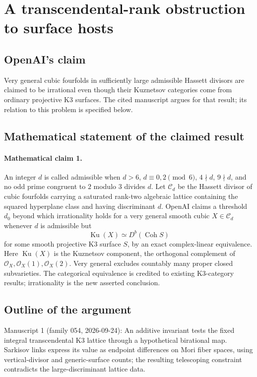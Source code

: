 \documentclass[11pt]{article}
\begin{document}
\section*{A transcendental-rank obstruction to surface hosts}

\subsection{OpenAI's claim}
Very general cubic fourfolds in sufficiently large admissible Hassett divisors are claimed to be irrational even though their Kuznetsov categories come from ordinary projective K3 surfaces. The cited manuscript argues for that result; its relation to this problem is specified below.

\subsection{Mathematical statement of the claimed result}
\paragraph{Mathematical claim 1.} An integer $d$ is called admissible when $d>6$, $d\equiv0,2\pmod6$, $4\nmid d$, $9\nmid d$, and no odd prime congruent to $2$ modulo $3$ divides $d$. Let $\mathcal C_d$ be the Hassett divisor of cubic fourfolds carrying a saturated rank-two algebraic lattice containing the squared hyperplane class and having discriminant $d$. OpenAI claims a threshold $d_0$ beyond which irrationality holds for a very general smooth cubic $X\in\mathcal C_d$ whenever $d$ is admissible but
\[
\operatorname{Ku}(X)\simeq D^b(\operatorname{Coh}S)
\]
for some smooth projective K3 surface $S$, by an exact complex-linear equivalence. Here $\operatorname{Ku}(X)$ is the Kuznetsov component, the orthogonal complement of $\mathcal O_X,\mathcal O_X(1),\mathcal O_X(2)$. Very general excludes countably many proper closed subvarieties. The categorical equivalence is credited to existing K3-category results; irrationality is the new asserted conclusion.

\subsection{Outline of the argument}
Manuscript 1 (family 054, 2026-09-24): An additive invariant tests the fixed integral transcendental K3 lattice through a hypothetical birational map. Sarkisov links express its value as endpoint differences on Mori fiber spaces, using vertical-divisor and generic-surface counts; the resulting telescoping constraint contradicts the large-discriminant lattice data.
\end{document}
